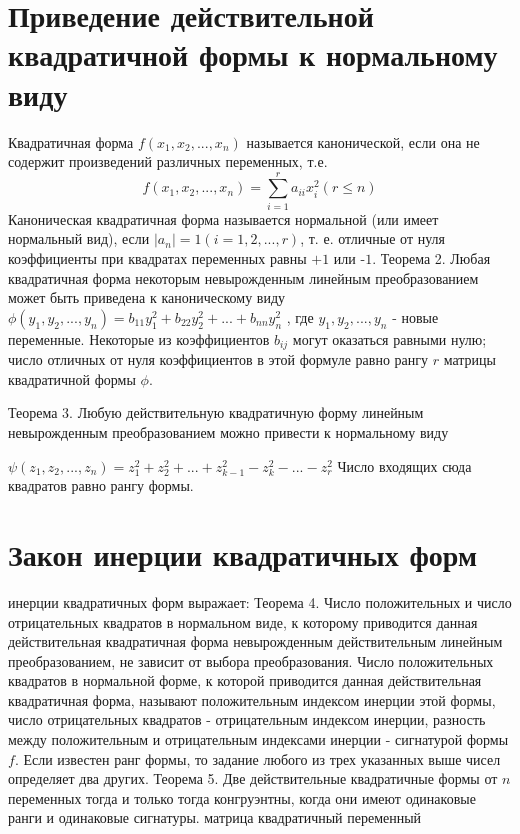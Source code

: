 \documentclass[bachelor, och, coursework, times]{SCWorks}
\newcommand\tab[1][1cm]{\hspace*{#1}}
\newcommand{\udsum}[3]{\sum\limits_{#1}^{#2}{#3}}
\newcommand{\tl}{\newline\tab}
\begin{document}
\section{Приведение действительной квадратичной формы к нормальному виду}
\tab Квадратичная форма $f(x_1,x_2,...,x_n)$ называется канонической, если она не содержит произведений различных переменных, т.е. $$f(x_1,x_2,...,x_n)=\udsum{i=1}{r}{a_{ii}x_i^2} (r \le n)$$
\tl
Каноническая квадратичная форма называется нормальной (или имеет нормальный вид), если $|a_n| = 1 ( i= 1, 2, . . . , r)$, т. е. отличные от нуля коэффициенты при квадратах переменных равны $+1$ или -$1$. 
\tl
Теорема 2. Любая квадратичная форма некоторым невырожденным линейным преобразованием может быть приведена к каноническому виду \newline $\phi(y_1,y_2,...,y_n)=b_{11}y_1^2+b_{22}y_2^2+...+b_{nn}y_n^2$ , где $y_1,y_2,...,y_n$ - новые переменные.
\tl
Некоторые из коэффициентов $b_{ij}$ могут оказаться равными нулю; число отличных от нуля коэффициентов в этой формуле равно рангу $r$ матрицы квадратичной формы $\phi$. 

Теорема 3. Любую действительную квадратичную форму линейным невырожденным преобразованием можно привести к нормальному виду

$\psi(z_1,z_2,...,z_n)=z_1^2+z_2^2+...+z_{k-1}^2-z_k^2-...-z_r^2$
Число входящих сюда квадратов равно рангу формы.

\section{Закон инерции квадратичных форм}
 инерции квадратичных форм выражает:
\tl
Теорема 4. Число положительных и число отрицательных квадратов в нормальном виде, к которому приводится данная действительная квадратичная форма невырожденным действительным линейным преобразованием, не зависит от выбора преобразования.
\tl
Число положительных квадратов в нормальной форме, к которой приводится данная действительная квадратичная форма, называют положительным индексом инерции этой формы, число отрицательных квадратов - отрицательным индексом инерции, разность между положительным и отрицательным индексами инерции - сигнатурой формы $f$. Если известен ранг формы, то задание любого из трех указанных выше чисел определяет два других.
\tl
Теорема 5. Две действительные квадратичные формы от $n$ переменных тогда и только тогда конгруэнтны, когда они имеют одинаковые ранги и одинаковые сигнатуры.
матрица квадратичный переменный
\end{document}
